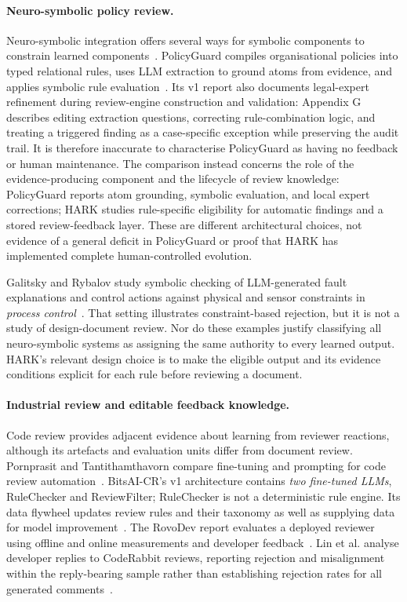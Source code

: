 \paragraph{Neuro-symbolic policy review.}
Neuro-symbolic integration offers several ways for symbolic components to constrain learned components~\cite{garcez2023}. PolicyGuard compiles organisational policies into typed relational rules, uses LLM extraction to ground atoms from evidence, and applies symbolic rule evaluation~\cite{malik2026}. Its v1 report also documents legal-expert refinement during review-engine construction and validation: Appendix G describes editing extraction questions, correcting rule-combination logic, and treating a triggered finding as a case-specific exception while preserving the audit trail. It is therefore inaccurate to characterise PolicyGuard as having no feedback or human maintenance. The comparison instead concerns the role of the evidence-producing component and the lifecycle of review knowledge: PolicyGuard reports atom grounding, symbolic evaluation, and local expert corrections; HARK studies rule-specific eligibility for automatic findings and a stored review-feedback layer. These are different architectural choices, not evidence of a general deficit in PolicyGuard or proof that HARK has implemented complete human-controlled evolution.

Galitsky and Rybalov study symbolic checking of LLM-generated fault explanations and control actions against physical and sensor constraints in \emph{process control}~\cite{neuro2026}. That setting illustrates constraint-based rejection, but it is not a study of design-document review. Nor do these examples justify classifying all neuro-symbolic systems as assigning the same authority to every learned output. HARK's relevant design choice is to make the eligible output and its evidence conditions explicit for each rule before reviewing a document.

\paragraph{Industrial review and editable feedback knowledge.}
Code review provides adjacent evidence about learning from reviewer reactions, although its artefacts and evaluation units differ from document review. Pornprasit and Tantithamthavorn compare fine-tuning and prompting for code review automation~\cite{pornprasit2024}. BitsAI-CR's v1 architecture contains \emph{two fine-tuned LLMs}, RuleChecker and ReviewFilter; RuleChecker is not a deterministic rule engine. Its data flywheel updates review rules and their taxonomy as well as supplying data for model improvement~\cite{sun2025}. The RovoDev report evaluates a deployed reviewer using offline and online measurements and developer feedback~\cite{rovo2026}. Lin et al. analyse developer replies to CodeRabbit reviews, reporting rejection and misalignment within the reply-bearing sample rather than establishing rejection rates for all generated comments~\cite{lin2026}.

